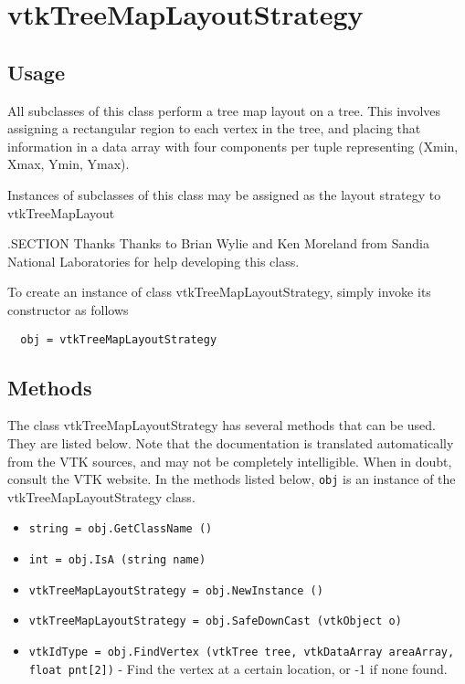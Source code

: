 \section{vtkTreeMapLayoutStrategy}

\subsection{Usage}

 All subclasses of this class perform a tree map layout on a tree.
 This involves assigning a rectangular region to each vertex in the tree,
 and placing that information in a data array with four components per
 tuple representing (Xmin, Xmax, Ymin, Ymax).

 Instances of subclasses of this class may be assigned as the layout
 strategy to vtkTreeMapLayout

 .SECTION Thanks
 Thanks to Brian Wylie and Ken Moreland from Sandia National Laboratories
 for help developing this class.

To create an instance of class vtkTreeMapLayoutStrategy, simply
invoke its constructor as follows
\begin{verbatim}
  obj = vtkTreeMapLayoutStrategy
\end{verbatim}
\subsection{Methods}

The class vtkTreeMapLayoutStrategy has several methods that can be used.
  They are listed below.
Note that the documentation is translated automatically from the VTK sources,
and may not be completely intelligible.  When in doubt, consult the VTK website.
In the methods listed below, \verb|obj| is an instance of the vtkTreeMapLayoutStrategy class.
\begin{itemize}
\item  \verb|string = obj.GetClassName ()|

\item  \verb|int = obj.IsA (string name)|

\item  \verb|vtkTreeMapLayoutStrategy = obj.NewInstance ()|

\item  \verb|vtkTreeMapLayoutStrategy = obj.SafeDownCast (vtkObject o)|

\item  \verb|vtkIdType = obj.FindVertex (vtkTree tree, vtkDataArray areaArray, float pnt[2])| -  Find the vertex at a certain location, or -1 if none found.

\end{itemize}
